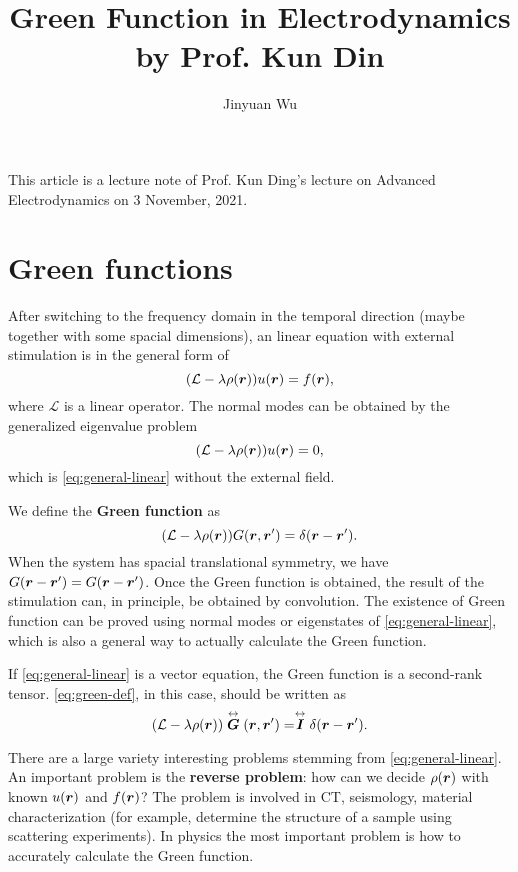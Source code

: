 \documentclass[hyperref, a4paper]{article}
\title{Green Function in Electrodynamics by Prof. Kun Din}
\author{Jinyuan Wu}
\renewcommand{\tensor}[1]{ \stackrel{\leftrightarrow}{\vb*{#1}}}
\newcommand*{\concept}[1]{{\textbf{#1}}}
\begin{document}
\maketitle

This article is a lecture note of Prof. Kun Ding's lecture on Advanced Electrodynamics on 3 November, 2021.

\section{Green functions}

After switching to the frequency domain in the temporal direction (maybe together with some spacial dimensions), 
an linear equation with external stimulation is in the general form of 
\begin{equation}
    (\mathcal{L} - \lambda \rho(\vb*{r})) u(\vb*{r}) = f(\vb*{r}),
    \label{eq:general-linear}
\end{equation}
where $\mathcal{L}$ is a linear operator. The normal modes can be obtained by the generalized eigenvalue problem
\begin{equation}
    (\mathcal{L} - \lambda \rho(\vb*{r})) u(\vb*{r}) = 0,
\end{equation}
which is \eqref{eq:general-linear} without the external field.

We define the \concept{Green function} as 
\begin{equation}
    (\mathcal{L} - \lambda \rho(\vb*{r})) G(\vb*{r}, \vb*{r}') = \delta(\vb*{r} - \vb*{r}').
    \label{eq:green-def}
\end{equation} 
When the system has spacial translational symmetry, we have $G(\vb*{r} - \vb*{r}') = G(\vb*{r} - \vb*{r}')$.
Once the Green function is obtained, the result of the stimulation can, in principle, be obtained by convolution.
The existence of Green function can be proved using normal modes or eigenstates of \eqref{eq:general-linear}, which is also a general way to actually calculate the Green function.

If \eqref{eq:general-linear} is a vector equation, the Green function is a second-rank tensor. 
\eqref{eq:green-def}, in this case, should be written as 
\begin{equation}
    (\mathcal{L} - \lambda \rho(\vb*{r})) \tensor{G}(\vb*{r}, \vb*{r}') = \tensor{I} \delta(\vb*{r} - \vb*{r}').
\end{equation}

There are a large variety interesting problems stemming from \eqref{eq:general-linear}.
An important problem is the \concept{reverse problem}: how can we decide $\rho(\vb*{r})$ with known $u(\vb*{r})$ and $f(\vb*{r})$?
The problem is involved in CT, seismology, material characterization (for example, determine the structure of a sample using scattering experiments).
In physics the most important problem is how to accurately calculate the Green function.
\end{document}
